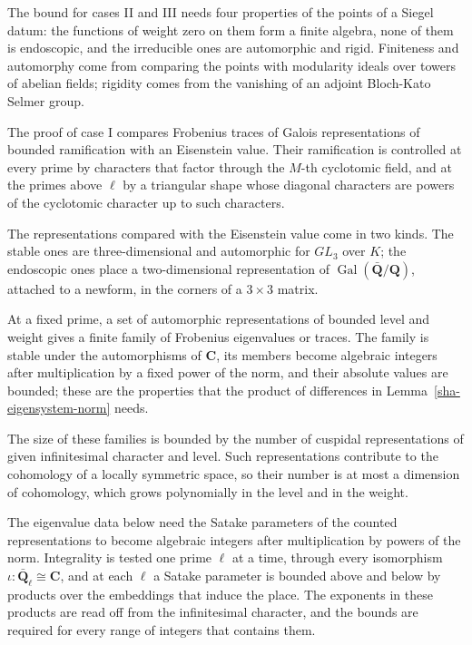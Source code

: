 The bound for cases II and III needs four properties of the points of a Siegel datum: the functions of weight zero on them form a finite algebra, none of them is endoscopic, and the irreducible ones are automorphic and rigid. Finiteness and automorphy come from comparing the points with modularity ideals over towers of abelian fields; rigidity comes from the vanishing of an adjoint Bloch-Kato Selmer group.

The proof of case I compares Frobenius traces of Galois representations of bounded ramification with an Eisenstein value. Their ramification is controlled at every prime by characters that factor through the $M$-th cyclotomic field, and at the primes above $\ell$ by a triangular shape whose diagonal characters are powers of the cyclotomic character up to such characters.

The representations compared with the Eisenstein value come in two kinds. The stable ones are three-dimensional and automorphic for $GL_3$ over $K$; the endoscopic ones place a two-dimensional representation of $\operatorname{Gal}(\bar{\mathbf Q}/\mathbf Q)$, attached to a newform, in the corners of a $3\times3$ matrix.

At a fixed prime, a set of automorphic representations of bounded level and weight gives a finite family of Frobenius eigenvalues or traces. The family is stable under the automorphisms of $\mathbf C$, its members become algebraic integers after multiplication by a fixed power of the norm, and their absolute values are bounded; these are the properties that the product of differences in Lemma~\ref{sha-eigensystem-norm} needs.

The size of these families is bounded by the number of cuspidal representations of given infinitesimal character and level. Such representations contribute to the cohomology of a locally symmetric space, so their number is at most a dimension of cohomology, which grows polynomially in the level and in the weight.

The eigenvalue data below need the Satake parameters of the counted representations to become algebraic integers after multiplication by powers of the norm. Integrality is tested one prime $\ell$ at a time, through every isomorphism $\iota:\bar{\mathbf Q}_\ell\cong\mathbf C$, and at each $\ell$ a Satake parameter is bounded above and below by products over the embeddings that induce the place. The exponents in these products are read off from the infinitesimal character, and the bounds are required for every range of integers that contains them.

